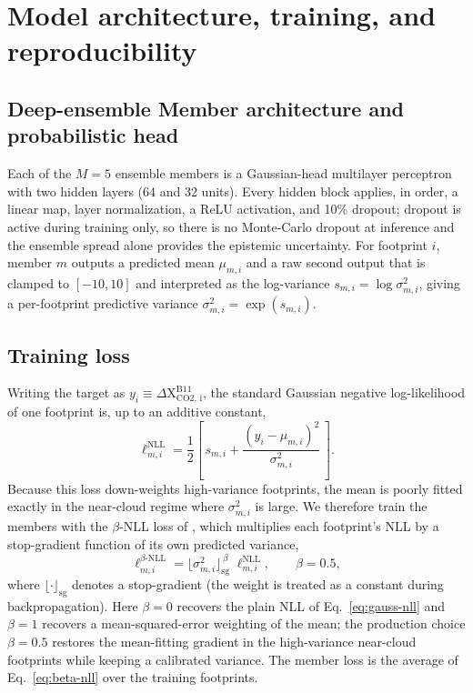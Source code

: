 \section{Model architecture, training, and reproducibility}
\label{app:model}



\subsection{Deep-ensemble Member architecture and probabilistic head}

Each of the $M = 5$ ensemble members is a Gaussian-head multilayer perceptron
with two hidden layers (64 and 32 units). Every hidden block applies, in order,
a linear map, layer normalization, a ReLU activation, and 10\% dropout; dropout
is active during training only, so there is no Monte-Carlo dropout at inference
and the ensemble spread alone provides the epistemic uncertainty. For footprint
$i$, member $m$ outputs a predicted mean $\mu_{m,i}$ and a raw second output that is clamped to $[-10, 10]$ and interpreted as the log-variance
$s_{m,i} = \log\sigma_{m,i}^{2}$, giving a per-footprint predictive variance
$\sigma_{m,i}^{2} = \exp(s_{m,i})$.

\subsection{Training loss}

Writing the target as $y_i \equiv \Delta \mathrm{X_{CO2,\,i}^{B11}}$, the standard
Gaussian negative log-likelihood of one footprint is, up to an additive constant,
%
\begin{equation}
  \ell^{\mathrm{NLL}}_{m,i}
  = \frac{1}{2}\left[\,s_{m,i}
  + \frac{(y_i-\mu_{m,i})^{2}}{\sigma_{m,i}^{2}}\,\right].
  \label{eq:gauss-nll}
\end{equation}
%
Because this loss down-weights high-variance footprints, the mean is poorly
fitted exactly in the near-cloud regime where $\sigma_{m,i}^{2}$ is large. We
therefore train the members with the $\beta$-NLL loss of
\citet{seitzer2022pitfalls}, which multiplies each footprint's NLL by a
stop-gradient function of its own predicted variance,
%
\begin{equation}
  \ell^{\beta\text{-}\mathrm{NLL}}_{m,i}
  = \bigl\lfloor\sigma_{m,i}^{2}\bigr\rfloor_{\mathrm{sg}}^{\,\beta}\;
  \ell^{\mathrm{NLL}}_{m,i},
  \qquad \beta = 0.5,
  \label{eq:beta-nll}
\end{equation}
%
where $\lfloor\cdot\rfloor_{\mathrm{sg}}$ denotes a stop-gradient (the weight is
treated as a constant during backpropagation). Here $\beta = 0$ recovers the
plain NLL of Eq.~\eqref{eq:gauss-nll} and $\beta = 1$ recovers a
mean-squared-error weighting of the mean; the production choice $\beta = 0.5$
restores the mean-fitting gradient in the high-variance near-cloud footprints
while keeping a calibrated variance. The member loss is the average of
Eq.~\eqref{eq:beta-nll} over the training footprints.

